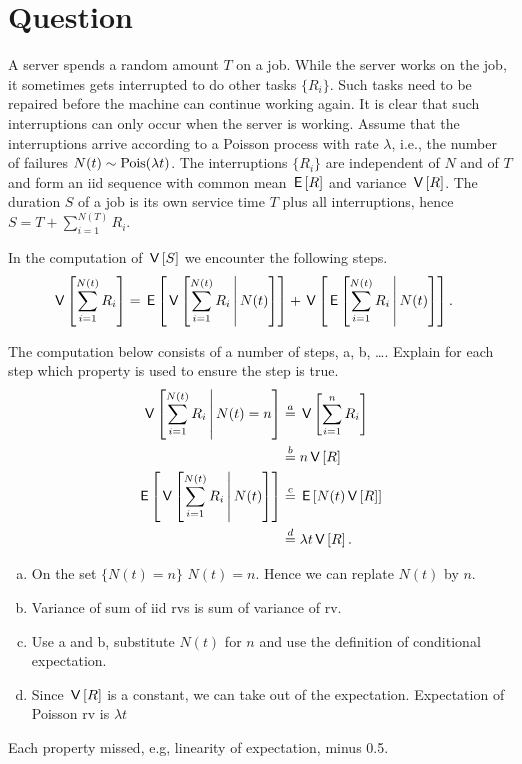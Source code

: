 \section{Question}


A server  spends a random amount $T$ on a job.
While the server works on the job, it sometimes gets interrupted to do other tasks $\{R_{i}\}$.
Such tasks need to be repaired before the machine can continue working again.
It is clear that such interruptions can only occur when the server is working.
Assume that the interruptions arrive according to a Poisson process with rate $\lambda$, i.e., the number of failures $N(t) \sim\mathrm{Pois}(\lambda t)$.
The interruptions $\{R_{i}\}$ are independent of $N$ and of $T$ and form an iid sequence with common mean $\,\mathsf{E}\left[R\right]$ and variance $\,\mathsf{V}\left[R\right]$.
The  duration $S$ of a job  is its own service time $T$ plus all interruptions, hence $S = T+ \sum_{i=1}^{N(T)} R_{i}$.

\begin{exercise}[1.5]
In the computation of $\,\mathsf{V}\left[S\right]$ we encounter the following steps.
\begin{align}
\,\mathsf{V}\left[\sum_{i=1}^{N(t)} R_{i}\right] &= \,\mathsf{E}\left[\,\mathsf{V}\left[\sum_{i=1}^{N(t)} R_{i}\,\middle|\, N(t)\right]\right] + \,\mathsf{V}\left[\,\mathsf{E}\left[\sum_{i=1}^{N(t)} R_{i}\,\middle|\, N(t)\right]\right].
\end{align}

The computation below consists of a number of steps, a, b, \ldots. Explain for each step which property is used to ensure the step is true.
\begin{align}
\,\mathsf{V}\left[\sum_{i=1}^{N(t)} R_{i}\,\middle|\, N(t)=n\right] &\stackrel{a}{=} \,\mathsf{V}\left[\sum_{i=1}^{n} R_{i}\right]  \\
  &\stackrel{b}{=} n \,\mathsf{V}\left[R\right] \\
\,\mathsf{E}\left[\,\mathsf{V}\left[\sum_{i=1}^{N(t)} R_{i}\,\middle|\, N(t)\right]\right] &  \stackrel{c}{=} \,\mathsf{E}\left[N(t) \,\mathsf{V}\left[R\right]\right] \\
&  \stackrel{d}{=}  \lambda t \,\mathsf{V}\left[R\right].
\end{align}
\begin{solution}
  \begin{enumerate}[a.]
  \item  On the set $\{N(t)=n\}$ $N(t)=n$. Hence we can replate  $N(t)$ by $n$.
  \item  Variance of sum of iid rvs is sum of variance of rv.
  \item  Use a and b, substitute $N(t)$ for $n$ and use the definition of conditional expectation.
  \item  Since $\,\mathsf{V}\left[R\right]$ is a constant, we can take out of the expectation. Expectation of Poisson rv is $\lambda t$
  \end{enumerate}
Each  property missed, e.g, linearity of expectation, minus 0.5.
\end{solution}
\end{exercise}


